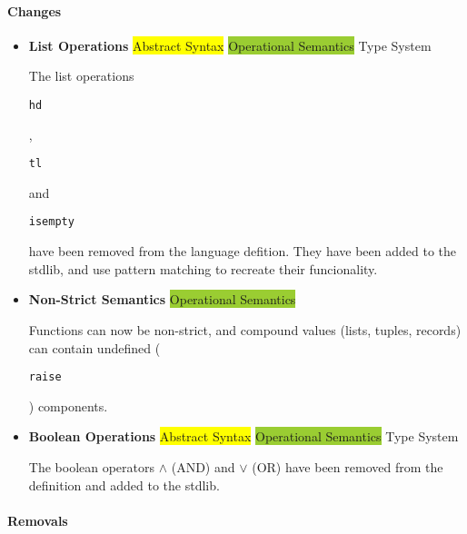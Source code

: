 \documentclass{article}
\def\code#1{\begin{footnotesize}\texttt{#1}\end{footnotesize}}
\begin{document}
\paragraph{Changes}

\begin{itemize}
  \item \textbf{List Operations} \; \; {\small\colorbox{yellow}{Abstract Syntax} \colorbox{YellowGreen}{Operational Semantics} \colorbox{ProcessBlue}{Type System}}

      The list operations \code{hd}, \code{tl} and \code{isempty} have been removed from the language defition.
      They have been added to the stdlib, and use pattern matching to recreate their funcionality.
\end{itemize}

\begin{itemize}
  \item \textbf{Non-Strict Semantics} \; \;
  { \colorbox{YellowGreen}{Operational Semantics}}

      Functions can now be non-strict, and compound values (lists, tuples, records) can contain undefined (\code{raise}) components.
\end{itemize}

\begin{itemize}
  \item \textbf{Boolean Operations} \; \;
  {\small\colorbox{yellow}{Abstract Syntax} \colorbox{YellowGreen}{Operational Semantics} \colorbox{ProcessBlue}{Type System}}

      The boolean operators $\wedge$ (AND) and $\vee$ (OR) have been removed from the definition and added to the stdlib.
\end{itemize}

\paragraph{Removals}
\end{document}
